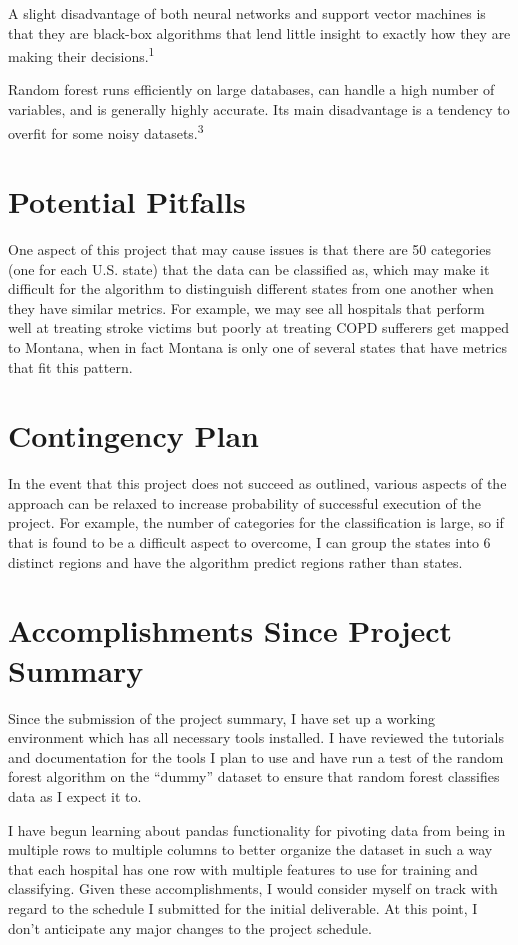 \documentclass{article}
\begin{document}
A slight disadvantage of both neural networks and support vector machines is that they are black-box algorithms that lend little insight to exactly how they are making their decisions.\textsuperscript{1}

Random forest runs efficiently on large databases, can handle a high number of variables, and is generally highly accurate. Its main disadvantage is a tendency to overfit for some noisy datasets.\textsuperscript{3}

\section{Potential Pitfalls}
One aspect of this project that may cause issues is that there are 50 categories (one for each U.S. state) that the data can be classified as, which may make it difficult for the algorithm to distinguish different states from one another when they have similar metrics. For example, we may see all hospitals that perform well at treating stroke victims but poorly at treating COPD sufferers get mapped to Montana, when in fact Montana is only one of several states that have metrics that fit this pattern.
\section{Contingency Plan}
In the event that this project does not succeed as outlined, various aspects of the approach can be relaxed to increase probability of successful execution of the project. For example, the number of categories for the classification is large, so if that is found to be a difficult aspect to overcome, I can group the states into 6 distinct regions and have the algorithm predict regions rather than states. 
\section{Accomplishments Since Project Summary}
Since the submission of the project summary, I have set up a working environment which has all necessary tools installed. 
I have reviewed the tutorials and documentation for the tools I plan to use and have run a test of the random forest algorithm on the ``dummy'' dataset to ensure that random forest classifies data as I expect it to. 

I have begun learning about pandas functionality for pivoting data from being in multiple rows to multiple columns to better organize the dataset in such a way that each hospital has one row with multiple features to use for training and classifying. 
Given these accomplishments, I would consider myself on track with regard to the schedule I submitted for the initial deliverable.
At this point, I don't anticipate any major changes to the project schedule.
\end{document}
